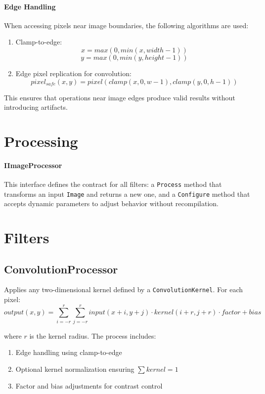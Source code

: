 \documentclass[12pt,a4paper]{report}
\begin{document}
\paragraph{Edge Handling}
When accessing pixels near image boundaries, the following algorithms are used:
\begin{enumerate}
    \item Clamp-to-edge:
    \[ x = max(0, min(x, width-1)) \]
    \[ y = max(0, min(y, height-1)) \]
    
    \item Edge pixel replication for convolution:
    \[ pixel_{safe}(x,y) = pixel(clamp(x,0,w-1), clamp(y,0,h-1)) \]
\end{enumerate}

This ensures that operations near image edges produce valid results without introducing artifacts.

\section{Processing}

\paragraph{IImageProcessor}
This interface defines the contract for all filters: a \texttt{Process} method that transforms an input \texttt{Image} and returns a new one, and a \texttt{Configure} method that accepts dynamic parameters to adjust behavior without recompilation.

\section{Filters}

\subsection{ConvolutionProcessor}
Applies any two-dimensional kernel defined by a \texttt{ConvolutionKernel}. For each pixel:
\[ output(x,y) = \sum_{i=-r}^r \sum_{j=-r}^r input(x+i,y+j) \cdot kernel(i+r,j+r) \cdot factor + bias \]

where $r$ is the kernel radius. The process includes:
\begin{enumerate}
    \item Edge handling using clamp-to-edge
    \item Optional kernel normalization ensuring $\sum kernel = 1$
    \item Factor and bias adjustments for contrast control
\end{enumerate}
\end{document}
